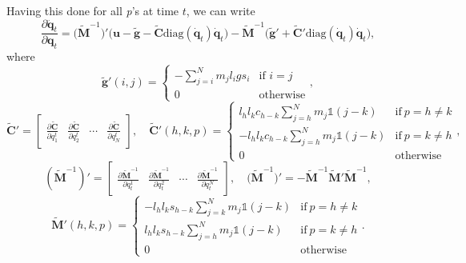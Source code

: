 \documentclass[10pt,a4paper]{article} %
\begin{document}
Having this done for all \emph{p}'s at time $t$, we can write
\begin{equation*}
	\frac{\partial \ddot{\bm{q}}_t}{\partial \bm{q}_t} = \Big(\tilde{\bm{M}}^{-1}\Big)'\Big(\bm{u} - \tilde{\bm{g}} - \tilde{\bm{C}}\text{diag}(\bm{\dot{q}}_t)\bm{\dot{q}}_t\Big) - 
	\tilde{\bm{M}}^{-1} \Big(\tilde{\bm{g}}' + \tilde{\bm{C}}' \text{diag}(\dot{\bm{q}}_t)\dot{\bm{q}}_t\Big),
\end{equation*}
where
\begin{equation*}
	\tilde{\bm{g}}'(i,j)=\begin{cases} 
      -\sum_{j=i}^N m_jl_i g s_i & \text{if } i = j \\
      0 & \text{otherwise}
   \end{cases},
\end{equation*}
\begin{equation*}
	\tilde{\bm{C}}' =\begin{bmatrix}
	\frac{\partial \tilde{\bm{C}}}{\partial q_1^t} & \frac{\partial \tilde{\bm{C}}}{\partial q_2^t} & \cdots & \frac{\partial \tilde{\bm{C}}}{\partial q_N^t}
	\end{bmatrix},\quad
	\tilde{\bm{C}}'(h,k,p)=\begin{cases} 
      l_hl_k c_{h-k} \sum_{j=h}^N m_j \mathds{1}(j-k) & \text{if} \ p =  h \neq k \\
      -l_hl_k c_{h-k} \sum_{j=h}^N m_j \mathds{1}(j-k) & \text{if} \  p = k \neq h\\
      0 & \text{otherwise}
   \end{cases},
\end{equation*}
\begin{equation*}
	(\tilde{\bm{M}}^{-1})' =\begin{bmatrix}
	\frac{\partial \tilde{\bm{M}}^{-1}}{\partial q_t^1} & \frac{\partial \tilde{\bm{M}}^{-1}}{\partial q_t^2} & \cdots & \frac{\partial \tilde{\bm{M}}^{-1}}{\partial q_t^N}
	\end{bmatrix},\quad
	\Big(\tilde{\bm{M}}^{-1}\Big)'= -\tilde{\bm{M}}^{-1}\tilde{\bm{M}}'\tilde{\bm{M}}^{-1},
\end{equation*}
\begin{equation*}
	\tilde{\bm{M}}'(h,k,p)= \begin{cases}
      -l_hl_k s_{h-k} \sum_{j=k}^N m_j \mathds{1}(j-k) & \text{if} \ p = h \neq k\\
      l_hl_k s_{h-k} \sum_{j=h}^N m_j \mathds{1}(j-k) & \text{if} \ p = k \neq h \\
      0 & \text{otherwise}
   \end{cases}.
\end{equation*}
\end{document}
